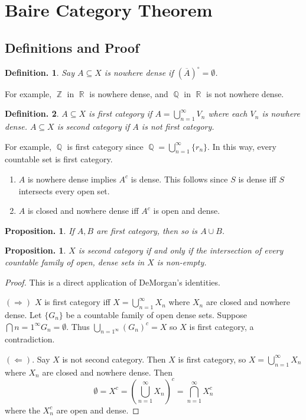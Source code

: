 \documentclass[11pt, a4paper]{memoir}
\DeclareMathOperator{\Q}{{\mathbb{Q}}}
\DeclareMathOperator{\Z}{{\mathbb{Z}}}
\DeclareMathOperator{\R}{{\mathbb{R}}}
\theoremstyle{change}
\newtheorem{proposition}[theorem]{Proposition.}
\theoremstyle{plain}
\theoremstyle{nonumberplain}
\newtheorem{definition}{Definition.}
\newtheorem{proof}{Proof}
\numberwithin{equation}{section}
\begin{document}
\section{Baire Category Theorem}
\subsection{Definitions and Proof}
\begin{definition}
    Say $A\subseteq X$ is nowhere dense if $(\overline{A})^\circ=\emptyset$.
\end{definition}
For example, $\Z$ in $\R$ is nowhere dense, and $\Q$ in $\R$ is not nowhere dense.
\begin{definition}
    $A\subseteq X$ is \textit{first category} if $A=\bigcup\limits_{n=1}^\infty V_n$ where each $V_n$ is nowhere dense.
    $A\subseteq X$ is \textit{second category} if $A$ is not first category.
\end{definition}
For example, $\Q$ is first category since $\Q=\bigcup_{n=1}^\infty\{r_n\}$.
In this way, every countable set is first category.
\begin{enumerate}
    \item $A$ is nowhere dense implies $A^c$ is dense.
        This follows since $S$ is dense iff $S$ intersects every open set.
    \item $A$ is closed and nowhere dense iff $A^c$ is open and dense.
\end{enumerate}
\begin{proposition}
    If $A,B$ are first category, then so is $A\cup B$.
\end{proposition}
\begin{proposition}
    $X$ is second category if and only if the intersection of every countable family of open, dense sets in $X$ is non-empty.
\end{proposition}
\begin{proof}
    This is a direct application of DeMorgan's identities.

    $(\Rightarrow)$ $X$ is first category iff $X=\bigcup_{n=1}^\infty X_n$ where $X_n$ are closed and nowhere dense.
    Let $\{G_n\}$ be a countable family of open dense sets.
    Suppose $\bigcap{n=1}^\infty G_n=\emptyset$.
    Thus $\bigcup_{n=1^\infty}(G_n)^c=X$ so $X$ is first category, a contradiction.

    $(\Leftarrow)$. Say $X$ is not second category.
    Then $X$ is first category, so $X=\bigcup_{n=1}^\infty X_n$ where $X_n$ are closed and nowhere dense.
    Then
    \[\emptyset=X^c=\left(\bigcup_{n=1}^\infty X_n\right)^c=\bigcap_{n=1}^\infty X_n^c\]
    where the $X_n^c$ are open and dense.
\end{proof}
\end{document}
